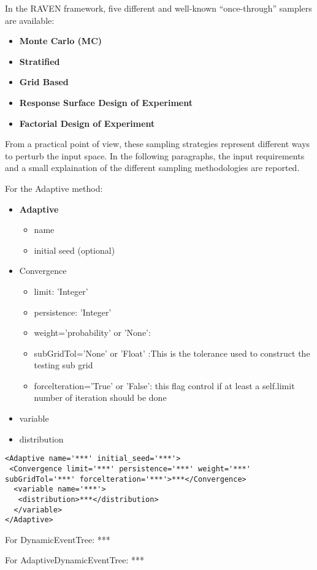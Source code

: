 In the RAVEN framework, five different and well-known “once-through” samplers are available: 
\begin{itemize}
\item \textbf{Monte Carlo (MC)}
\item \textbf{Stratified}
\item \textbf{Grid Based}
\item \textbf{Response Surface Design of Experiment}
\item \textbf{Factorial Design of Experiment}
\end{itemize}
From a practical point of view, these sampling strategies represent different ways to perturb the input space. In the following paragraphs, the input requirements and a small explaination of the different sampling methodologies are reported.





For the Adaptive method:
\begin{itemize}
\item \textbf{Adaptive}
\begin{itemize}
\item name
\item initial seed (optional)
\end{itemize}
\item Convergence
\begin{itemize}
\item limit: 'Integer'
\item persistence: 'Integer'
\item weight='probability' or 'None': 
\item subGridTol='None' or 'Float' :This is the tolerance used to construct the testing sub grid
\item forcelteration='True' or 'False': this flag control if at least a self.limit number of iteration should be done
\end{itemize}
\item variable
\item distribution
\end{itemize}

\begin{lstlisting}[style=XML]
<Adaptive name='***' initial_seed='***'> 
 <Convergence limit='***' persistence='***' weight='***' subGridTol='***' forcelteration='***'>***</Convergence>  
  <variable name='***'>
   <distribution>***</distribution>
  </variable> 
</Adaptive>   
\end{lstlisting}



For DynamicEventTree:
***

For AdaptiveDynamicEventTree:
***


























